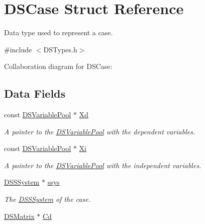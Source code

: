 \hypertarget{struct_d_s_case}{
\section{DSCase Struct Reference}
\label{struct_d_s_case}
}


Data type used to represent a case.  




{\ttfamily \#include $<$DSTypes.h$>$}



Collaboration diagram for DSCase:\subsection*{Data Fields}
\begin{DoxyCompactItemize}
\item 
\hypertarget{struct_d_s_case_a739550585a18a79b3f809fc0b0d2658b}{
const \hyperlink{struct_d_s_variable_pool}{DSVariablePool} $\ast$ \hyperlink{struct_d_s_case_a739550585a18a79b3f809fc0b0d2658b}{Xd}}
\label{struct_d_s_case_a739550585a18a79b3f809fc0b0d2658b}

\begin{DoxyCompactList}\small\item\em A pointer to the \hyperlink{struct_d_s_variable_pool}{DSVariablePool} with the dependent variables. \item\end{DoxyCompactList}\item 
\hypertarget{struct_d_s_case_a00cfed7027afc5b8218687b951287742}{
const \hyperlink{struct_d_s_variable_pool}{DSVariablePool} $\ast$ \hyperlink{struct_d_s_case_a00cfed7027afc5b8218687b951287742}{Xi}}
\label{struct_d_s_case_a00cfed7027afc5b8218687b951287742}

\begin{DoxyCompactList}\small\item\em A pointer to the \hyperlink{struct_d_s_variable_pool}{DSVariablePool} with the independent variables. \item\end{DoxyCompactList}\item 
\hypertarget{struct_d_s_case_abb70d0151846760d948b6197579c4311}{
\hyperlink{struct_d_s_s_system}{DSSSystem} $\ast$ \hyperlink{struct_d_s_case_abb70d0151846760d948b6197579c4311}{ssys}}
\label{struct_d_s_case_abb70d0151846760d948b6197579c4311}

\begin{DoxyCompactList}\small\item\em The \hyperlink{struct_d_s_s_system}{DSSSystem} of the case. \item\end{DoxyCompactList}\item 
\hypertarget{struct_d_s_case_a3f0ef631e7fc4b26d38a5ddb6555cf99}{
\hyperlink{struct_d_s_matrix}{DSMatrix} $\ast$ \hyperlink{struct_d_s_case_a3f0ef631e7fc4b26d38a5ddb6555cf99}{Cd}}
\label{struct_d_s_case_a3f0ef631e7fc4b26d38a5ddb6555cf99}


\end{DoxyCompactItemize}
